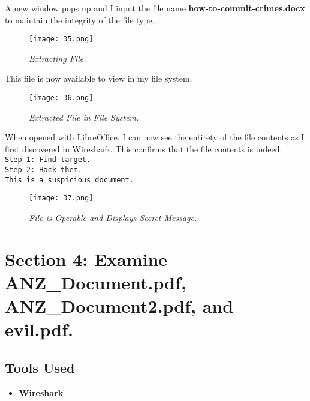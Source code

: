 A new window pops up and I input the file name \textbf{how-to-commit-crimes.docx} to maintain the integrity of the file type.

\begin{figure}[H]
    \setlength{\abovecaptionskip}{20pt}
    \setlength{\belowcaptionskip}{0pt}
    \centering
    \texttt{[image: 35.png]}
    \captionsetup{justification=centering}
    \caption{\textit{Extracting File.}}
    \label{fig:35}
\end{figure}
\vspace{-10pt}

This file is now available to view in my file system.

\begin{figure}[H]
    \setlength{\abovecaptionskip}{20pt}
    \setlength{\belowcaptionskip}{0pt}
    \centering
    \texttt{[image: 36.png]}
    \captionsetup{justification=centering}
    \caption{\textit{Extracted File in File System.}}
    \label{fig:36}
\end{figure}
\vspace{-10pt}

When opened with LibreOffice, I can now see the entirety of the file contents as I first discovered in Wireshark. This confirms that the file contents is indeed:\\
\texttt{Step 1: Find target.}\\
\texttt{Step 2: Hack them.}\\
\texttt{This is a suspicious document.}\\

\begin{figure}[H]
    \setlength{\abovecaptionskip}{20pt}
    \setlength{\belowcaptionskip}{0pt}
    \centering
    \texttt{[image: 37.png]}
    \captionsetup{justification=centering}
    \caption{\textit{File is Operable and Displays Secret Message.}}
    \label{fig:37}
\end{figure}
\vspace{-10pt}

\section{Section 4: Examine \textbf{ANZ\_Document.pdf, ANZ\_Document2.pdf,} and \textbf{evil.pdf}.}
\subsection{Tools Used}
\begin{itemize}
    \item \textbf{Wireshark}
\end{itemize}

